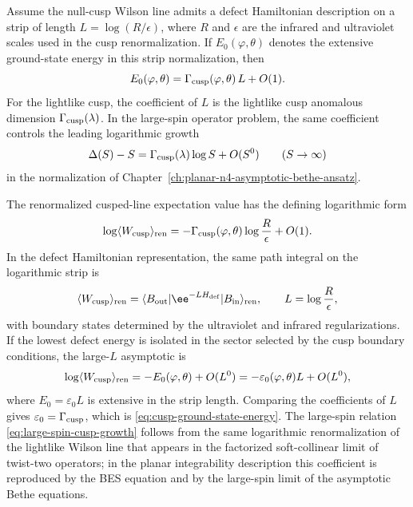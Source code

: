 \begin{remark}
\label{rem:cusp-as-defect-ground-state-energy}
Assume the null-cusp Wilson line admits a defect Hamiltonian description on a
strip of length \(L=\log(R/\epsilon)\), where \(R\) and \(\epsilon\) are the
infrared and ultraviolet scales used in the cusp renormalization.  If
\(E_0(\varphi,\theta)\) denotes the extensive ground-state energy in this
strip normalization, then
\begin{equation}
  E_0(\varphi,\theta)
  =
  \Gamma_{\rm cusp}(\varphi,\theta)\,L+O(1).
  \label{eq:cusp-ground-state-energy}
\end{equation}
For the lightlike cusp, the coefficient of \(L\) is the lightlike cusp
anomalous dimension \(\Gamma_{\rm cusp}(\lambda)\).  In the large-spin
operator problem, the same coefficient controls the leading logarithmic
growth
\begin{equation}
  \Delta(S)-S
  =
  \Gamma_{\rm cusp}(\lambda)\log S+O(S^0)
  \qquad (S\to\infty)
  \label{eq:large-spin-cusp-growth}
\end{equation}
in the normalization of
Chapter~\ref{ch:planar-n4-asymptotic-bethe-ansatz}.

The renormalized cusped-line expectation value has the defining logarithmic
form
\[
  \log\langle W_{\rm cusp}\rangle_{\rm ren}
  =
  -\Gamma_{\rm cusp}(\varphi,\theta)\log\frac{R}{\epsilon}+O(1).
\]
In the defect Hamiltonian representation, the same path integral on the
logarithmic strip is
\[
  \langle W_{\rm cusp}\rangle_{\rm ren}
  =
  \langle B_{\rm out}|\ee^{-LH_{\rm def}}|B_{\rm in}\rangle_{\rm ren},
  \qquad
  L=\log\frac{R}{\epsilon},
\]
with boundary states determined by the ultraviolet and infrared
regularizations.  If the lowest defect energy is isolated in the sector
selected by the cusp boundary conditions, the large-\(L\) asymptotic is
\[
  \log\langle W_{\rm cusp}\rangle_{\rm ren}
  =
  -E_0(\varphi,\theta)+O(L^0)
  =
  -\varepsilon_0(\varphi,\theta)L+O(L^0),
\]
where \(E_0=\varepsilon_0L\) is extensive in the strip length.  Comparing the
coefficients of \(L\) gives
\(\varepsilon_0=\Gamma_{\rm cusp}\), which is
\eqref{eq:cusp-ground-state-energy}.  The large-spin relation
\eqref{eq:large-spin-cusp-growth} follows from the same logarithmic
renormalization of the lightlike Wilson line that appears in the factorized
soft-collinear limit of twist-two operators; in the planar integrability
description this coefficient is reproduced by the BES equation and by the
large-spin limit of the asymptotic Bethe equations.
\end{remark}

